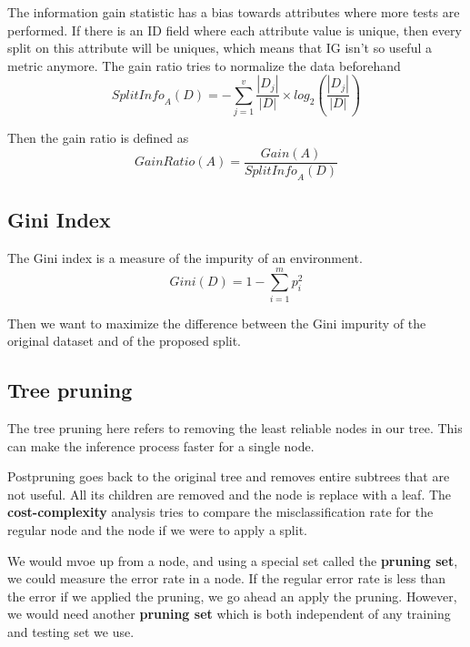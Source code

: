 \documentclass[
  paper=a4,
,captions=tableheading
]{scrartcl}
\begin{document}
The information gain statistic has a bias towards attributes where more
tests are performed. If there is an ID field where each attribute value
is unique, then every split on this attribute will be uniques, which
means that IG isn't so useful a metric anymore. The gain ratio tries to
normalize the data beforehand \begin{equation}
\mathit{SplitInfo}_{A}(D) = -\sum_{j=1}^{v}\frac{|D_{j}|}{|D|} \times log_{2}(\frac{|D_{j}|}{|D|})
\end{equation}

Then the gain ratio is defined as \begin{equation}
\mathit{GainRatio}(A) = \frac{\mathit{Gain}(A)}{\mathit{SplitInfo}_{A}(D)}
\end{equation}

\hypertarget{gini-index}{%
\subsection{Gini Index}\label{gini-index}}

The Gini index is a measure of the impurity of an environment.
\begin{equation}
\mathit{Gini}(D) = 1 - \sum_{i=1}^{m}p^{2}_{i}
\end{equation}

Then we want to maximize the difference between the Gini impurity of the
original dataset and of the proposed split.

\hypertarget{tree-pruning}{%
\subsection{Tree pruning}\label{tree-pruning}}

The tree pruning here refers to removing the least reliable nodes in our
tree. This can make the inference process faster for a single node.

Postpruning goes back to the original tree and removes entire subtrees
that are not useful. All its children are removed and the node is
replace with a leaf. The \textbf{cost-complexity} analysis tries to
compare the misclassification rate for the regular node and the node if
we were to apply a split.

We would mvoe up from a node, and using a special set called the
\textbf{pruning set}, we could measure the error rate in a node. If the
regular error rate is less than the error if we applied the pruning, we
go ahead an apply the pruning. However, we would need another
\textbf{pruning set} which is both independent of any training and
testing set we use.
\end{document}
